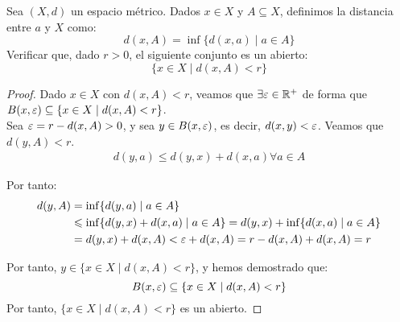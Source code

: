 \begin{ejercicio}
    Sea $(X,d)$ un espacio métrico. Dados $x\in X$ y $A\subseteq X$, definimos la distancia entre $a$ y $X$ como:
    \begin{equation*}
        d(x,A) = \inf\{d(x,a) \mid a\in A\}
    \end{equation*}
    Verificar que, dado $r>0$, el siguiente conjunto es un abierto:
    \begin{equation*}
        \{x\in X\mid d(x,A) < r\}
    \end{equation*}
\end{ejercicio}
\begin{proof}
    Dado $x\in X$ con $d(x,A) < r$, veamos que $\exists \varepsilon\in \mathbb{R}^+$ de forma que $B(x,\varepsilon) \subseteq \{x\in X\mid d(x,A) < r\}$.\\

    Sea $\varepsilon=r-d(x,A)>0$, y sea $y\in B(x,\varepsilon)$, es decir, $d(x,y) < \varepsilon$. Veamos que $d(y,A) < r$.
    \begin{align*}
        d(y,a) \leq d(y,x) + d(x,a) \forall a\in A
    \end{align*}

    Por tanto:
    \begin{align*}
        d(y,A) &= \inf\{d(y,a) \mid a\in A\} \\
        &\leqslant \inf\{d(y,x) + d(x,a) \mid a\in A\}
        = d(y,x) + \inf\{d(x,a) \mid a\in A\} \\
        &= d(y,x) + d(x,A)< \varepsilon + d(x,A) = r-d(x,A) + d(x,A) = r
    \end{align*}

    Por tanto, $y\in \{x\in X\mid d(x,A) < r\}$, y hemos demostrado que:
    \begin{equation*}
        B(x,\varepsilon) \subseteq \{x\in X\mid d(x,A) < r\}
    \end{equation*}
    Por tanto, $\{x\in X\mid d(x,A) < r\}$ es un abierto.
\end{proof}


